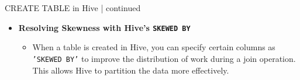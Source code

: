 		\begin{frame}{CREATE TABLE in Hive | continued}
			\begin{tcolorbox}[colback=white,colframe=black,title= Part 10: Data Skewing]
				\small
				\begin{itemize}
			  		\item \textbf{Resolving Skewness with Hive's \texttt{SKEWED BY} }
			  		\begin{itemize}
						\item When a table is created in Hive, you can specify certain columns as \texttt{'SKEWED BY'} to improve the distribution of work during a join operation. This allows Hive to partition the data more effectively.
			  		\end{itemize}
				\end{itemize}
			\end{tcolorbox}	
		\end{frame}













































